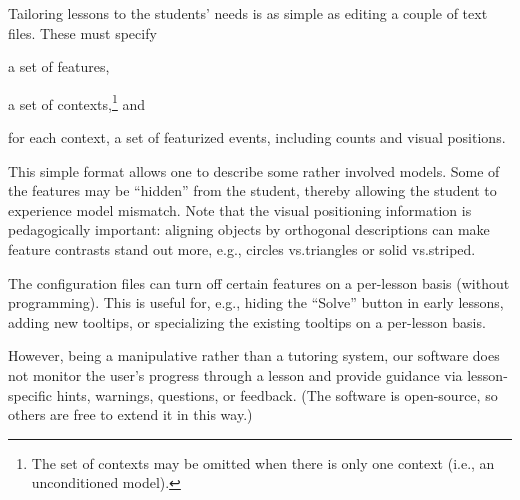\documentclass[11pt,letterpaper]{article}
\newcommand{\Note}[1]{}
\renewcommand{\Note}[1]{\hl{[#1]}}  %
\newcommand{\NoteSigned}[3]{{\sethlcolor{#2}\Note{#1: #3}}}
\newcommand{\NoteFF}[1]{\NoteSigned{FF}{LightBlue}{#1}}
\newcommand{\NoteJE}[1]{\NoteSigned{JE}{LightGreen}{#1}}
\begin{document}
Tailoring lessons to the students' needs is as simple as editing a
couple of text files. These must specify
\begin{inparaenum}[(1)]
\item a set of features, 
\item a set of contexts,\footnote{The set of contexts may be omitted
    when there is only one context (i.e., an unconditioned model).}
  and
\item for each context, a set of 
featurized events, including counts and visual positions.
\end{inparaenum}
This simple format allows one to describe some rather involved
models.  Some of the features may be ``hidden'' from the student, thereby allowing the student to experience 
model mismatch.  Note that the visual positioning information is pedagogically 
important: aligning objects by orthogonal descriptions can make feature contrasts stand out more, 
e.g., circles vs.\@ triangles or solid vs.\@ striped.

The configuration files can turn off certain features on a per-lesson basis (without programming).  This is 
useful for, e.g., hiding the ``Solve'' button in early lessons, adding new tooltips, or specializing
the existing tooltips on a per-lesson basis.

However, being a manipulative rather than a tutoring system, our
software does not monitor the user's progress through a lesson and
provide guidance via lesson-specific hints, warnings, questions, or
feedback.  (The software is open-source, so others are free to extend
it in this way.)

\end{document}
